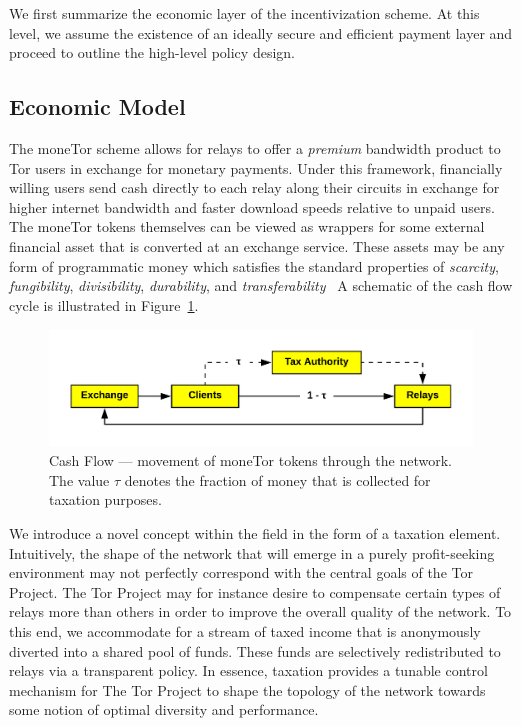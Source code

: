 
We first summarize the economic layer of the incentivization scheme. At this
level, we assume the existence of an ideally secure and efficient payment layer
and proceed to outline the high-level policy design.

\subsection{Economic Model}
The moneTor scheme allows for relays to offer a \emph{premium} bandwidth product
to Tor users in exchange for monetary payments. Under this framework,
financially willing users send cash directly to each relay along their circuits
in exchange for higher internet bandwidth and faster download speeds relative to
unpaid users. The moneTor tokens themselves can be viewed as wrappers for some
external financial asset that is converted at an exchange service. These assets
may be any form of programmatic money which satisfies the standard properties of
\textit{scarcity}, \textit{fungibility}, \textit{divisibility},
\textit{durability}, and
\textit{transferability}~\cite[p.3]{crump2011phenomenon} A schematic of the cash
flow cycle is illustrated in Figure~\ref{fig:economic}.
\begin{figure}[h] \centering
  \includegraphics[trim={0.5cm, 0.5cm, 0.5cm, 0.5cm}, clip, scale=0.7]{images/economic_diagram.png}
  \caption[Cash Flow]{Cash Flow --- movement of moneTor tokens through the
    network. The value $\tau$ denotes the fraction of money that is collected
    for taxation purposes.}
  \label{fig:economic}
\end{figure}
We introduce a novel concept within the field in the form of a
taxation element. Intuitively, the shape of the network that will
emerge in a purely profit-seeking environment may not perfectly
correspond with the central goals of the Tor Project. The Tor Project
may for instance desire to compensate certain types of relays more
than others in order to improve the overall quality of the network. To
this end, we accommodate for a stream of taxed income that is
anonymously diverted into a shared pool of funds. These funds are
selectively redistributed to relays via a transparent policy.  In
essence, taxation provides a tunable control mechanism for The Tor
Project to shape the topology of the network towards some notion of
optimal diversity and performance.

